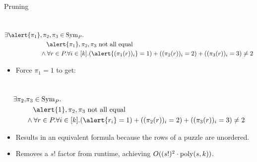 \documentclass[t,10pt,
mathserif,xcolor=dvipsnames]{beamer}
\begin{document}
\begin{myframe}{Pruning}

  ~\\[-5ex]
  \begin{equation*}
    \begin{aligned}
      \exists \alert{\pi_1}&,\pi_2, \pi_3 \in \Sym{P}.\\
      &~~~\alert{\pi_1}, \pi_2, \pi_3 \text{ not all equal}\\
      &\wedge \forall r \in P. \forall i \in [k]. (\alert{(\pi_1(r))_i} = 1) + ((\pi_2(r))_i = 2) + ((\pi_3(r))_i = 3) \neq 2
    \end{aligned}
  \end{equation*}

  \begin{itemize}
  \item Force $\pi_1 = 1$ to get:
  \end{itemize}

  ~\\[-5ex]
  \begin{equation*}
    \begin{aligned}
      \exists \pi_2,&\pi_3 \in \Sym{P}.\\
      &~~~\alert{1}, \pi_2, \pi_3 \text{ not all equal}\\
      &\wedge \forall r \in P. \forall i \in [k]. (\alert{r_i} = 1) + ((\pi_2(r))_i = 2) + ((\pi_3(r))_i = 3) \neq 2
    \end{aligned}
  \end{equation*}
  
  \begin{itemize}
  \item Results in an equivalent formula because the rows of a puzzle
    are unordered.
  \item Removes a $s!$ factor from runtime, achieving $O((s!)^2 \cdot
    \mathrm{poly}(s,k))$.
  \end{itemize}


  
\end{myframe}
\end{document}
